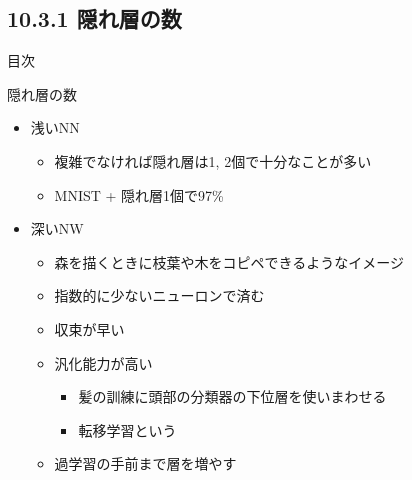 \documentclass[aspectratio=169, dvipdfmx, 14pt, xcolor={svgnames,dvipsnames}]{beamer}
\def\tightlist{\itemsep1pt\parskip0pt\parsep0pt}
\begin{document}

\hypertarget{ux96a0ux308cux5c64ux306eux6570}{%
  \subsection{10.3.1 隠れ層の数}\label{ux96a0ux308cux5c64ux306eux6570}}
\begin{frame}{\quad 目次}
  \tableofcontents[currentsubsection]
\end{frame}


\begin{frame}{\quad 隠れ層の数}
  \begin{itemize}
    \tightlist
    \item
          浅いNN

          \begin{itemize}
            \tightlist
            \item
                  複雑でなければ隠れ層は1, 2個で十分なことが多い
            \item
                  MNIST + 隠れ層1個で97\%
          \end{itemize}
    \item
          深いNW

          \begin{itemize}
            \tightlist
            \item
                  森を描くときに枝葉や木をコピペできるようなイメージ
            \item
                  指数的に少ないニューロンで済む
            \item
                  収束が早い
            \item
                  汎化能力が高い

                  \begin{itemize}
                    \tightlist
                    \item
                          髪の訓練に頭部の分類器の下位層を使いまわせる
                    \item
                          \alert{転移学習}という
                  \end{itemize}
            \item
                  過学習の手前まで層を増やす
          \end{itemize}
  \end{itemize}
\end{frame}
\end{document}
